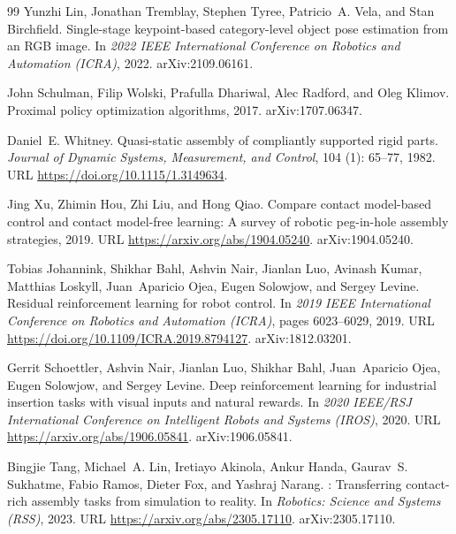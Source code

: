 \documentclass[10pt]{article}
\begin{document}
\begin{thebibliography}{99}
Yunzhi Lin, Jonathan Tremblay, Stephen Tyree, Patricio~A. Vela, and Stan
  Birchfield.
\newblock Single-stage keypoint-based category-level object pose estimation
  from an {RGB} image.
\newblock In {\em 2022 IEEE International Conference on Robotics and Automation
  (ICRA)}, 2022.
\newblock arXiv:2109.06161.

John Schulman, Filip Wolski, Prafulla Dhariwal, Alec Radford, and Oleg Klimov.
\newblock Proximal policy optimization algorithms, 2017.
\newblock arXiv:1707.06347.

Daniel~E. Whitney.
\newblock Quasi-static assembly of compliantly supported rigid parts.
\newblock \emph{Journal of Dynamic Systems, Measurement, and Control},
  104 (1): 65--77, 1982.
\newblock URL \url{https://doi.org/10.1115/1.3149634}.

Jing Xu, Zhimin Hou, Zhi Liu, and Hong Qiao.
\newblock Compare contact model-based control and contact model-free learning:
  A survey of robotic peg-in-hole assembly strategies, 2019.
\newblock URL \url{https://arxiv.org/abs/1904.05240}.
\newblock arXiv:1904.05240.

Tobias Johannink, Shikhar Bahl, Ashvin Nair, Jianlan Luo, Avinash Kumar,
  Matthias Loskyll, Juan~Aparicio Ojea, Eugen Solowjow, and Sergey Levine.
\newblock Residual reinforcement learning for robot control.
\newblock In \emph{2019 IEEE International Conference on Robotics and
  Automation (ICRA)}, pages 6023--6029, 2019.
\newblock URL \url{https://doi.org/10.1109/ICRA.2019.8794127}.
\newblock arXiv:1812.03201.

Gerrit Schoettler, Ashvin Nair, Jianlan Luo, Shikhar Bahl, Juan~Aparicio Ojea,
  Eugen Solowjow, and Sergey Levine.
\newblock Deep reinforcement learning for industrial insertion tasks with
  visual inputs and natural rewards.
\newblock In \emph{2020 IEEE/RSJ International Conference on Intelligent Robots
  and Systems (IROS)}, 2020.
\newblock URL \url{https://arxiv.org/abs/1906.05841}.
\newblock arXiv:1906.05841.

Bingjie Tang, Michael~A. Lin, Iretiayo Akinola, Ankur Handa, Gaurav~S.
  Sukhatme, Fabio Ramos, Dieter Fox, and Yashraj Narang.
: Transferring contact-rich assembly tasks from
  simulation to reality.
\newblock In \emph{Robotics: Science and Systems (RSS)}, 2023.
\newblock URL \url{https://arxiv.org/abs/2305.17110}.
\newblock arXiv:2305.17110.


\end{thebibliography}
\end{document}
